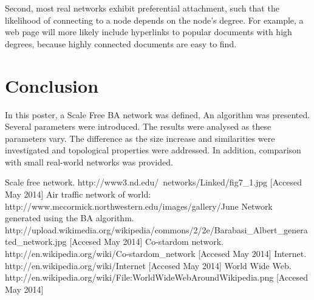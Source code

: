 \documentclass[a0,final]{a0poster}
\begin{document}
\begin{multicols}{3}
Second, most real networks exhibit preferential attachment, such that the likelihood of connecting to a node depends on the node’s degree. For example, a web page will more likely include hyperlinks to popular documents with high degrees, because highly connected documents are easy to find. 




\section*{Conclusion}
In this poster, a Scale Free BA network was defined, An algorithm was presented. Several parameters were introduced. The results were analysed as these parameters vary. The difference as the size increase and similarities were investigated and topological properties were addressed. In addition, comparison with small real-world networks was provided. 


\begin{bibliography}{6}

 Scale free network. http://www3.nd.edu/~networks/Linked/fig7_1.jpg [Accesed May 2014]
 Air traffic network of world: http://www.mccormick.northwestern.edu/images/gallery/June%
 Network generated using the BA algorithm. http://upload.wikimedia.org/wikipedia/commons/2/2e/Barabasi_Albert_generated_network.jpg [Accesed May 2014]
 Co-stardom network. http://en.wikipedia.org/wiki/Co-stardom_network [Accesed May 2014]
 Internet. http://en.wikipedia.org/wiki/Internet [Accesed May 2014]
 World Wide Web. http://en.wikipedia.org/wiki/File:WorldWideWebAroundWikipedia.png [Accesed May 2014]

\end{bibliography}

\end{multicols}
\end{document}
